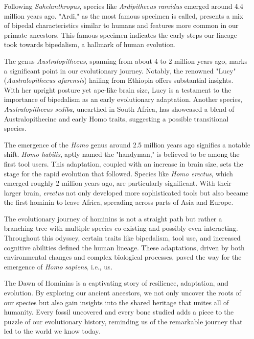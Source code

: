 Following \textit{Sahelanthropus}, species like \textit{Ardipithecus ramidus} emerged around 4.4 million years ago. "Ardi," as the most famous specimen is called, presents a mix of bipedal characteristics similar to humans and features more common in our primate ancestors. This famous specimen indicates the early steps our lineage took towards bipedalism, a hallmark of human evolution.

The genus \textit{Australopithecus}, spanning from about 4 to 2 million years ago, marks a significant point in our evolutionary journey. Notably, the renowned "Lucy" (\textit{Australopithecus afarensis}) hailing from Ethiopia offers substantial insights. With her upright posture yet ape-like brain size, Lucy is a testament to the importance of bipedalism as an early evolutionary adaptation. Another species, \textit{Australopithecus sediba}, unearthed in South Africa, has showcased a blend of Australopithecine and early Homo traits, suggesting a possible transitional species.

The emergence of the \textit{Homo} genus around 2.5 million years ago signifies a notable shift. \textit{Homo habilis}, aptly named the "handyman," is believed to be among the first tool users. This adaptation, coupled with an increase in brain size, sets the stage for the rapid evolution that followed. Species like \textit{Homo erectus}, which emerged roughly 2 million years ago, are particularly significant. With their larger brain, \textit{erectus} not only developed more sophisticated tools but also became the first hominin to leave Africa, spreading across parts of Asia and Europe.

The evolutionary journey of hominins is not a straight path but rather a branching tree with multiple species co-existing and possibly even interacting. Throughout this odyssey, certain traits like bipedalism, tool use, and increased cognitive abilities defined the human lineage. These adaptations, driven by both environmental changes and complex biological processes, paved the way for the emergence of \textit{Homo sapiens}, i.e., us.

The Dawn of Hominins is a captivating story of resilience, adaptation, and evolution. By exploring our ancient ancestors, we not only uncover the roots of our species but also gain insights into the shared heritage that unites all of humanity. Every fossil uncovered and every bone studied adds a piece to the puzzle of our evolutionary history, reminding us of the remarkable journey that led to the world we know today.

